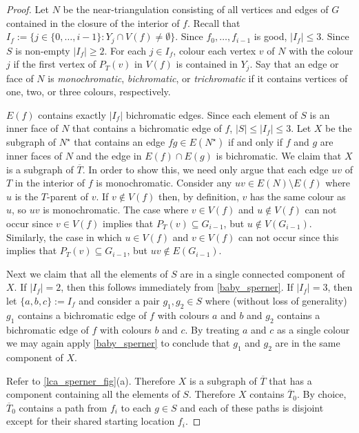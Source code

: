 \documentclass{patmorin}
\begin{document}
\begin{proof}
  Let $N$ be the near-triangulation consisting of all vertices and edges of $G$ contained in the closure of the interior of $f$.  Recall that $I_f:=\{j\in\{0,\ldots,i-1\}: Y_j\cap V(f)\neq\emptyset\}$.  Since $f_0,\ldots,f_{i-1}$ is good, $|I_f|\le 3$.  Since $S$ is non-empty $|I_f|\ge 2$.  For each $j\in I_f$, colour each vertex $v$ of $N$ with the colour $j$ if the first vertex of $P_{T}(v)$ in $V(f)$ is contained in $Y_j$.  Say that an edge or face of $N$ is \emph{monochromatic}, \emph{bichromatic}, or \emph{trichromatic} if it contains vertices of one, two, or three colours, respectively.

  $E(f)$ contains exactly $|I_f|$ bichromatic edges.  Since each element of $S$ is an inner face of $N$ that contains a bichromatic edge of $f$, $|S|\le |I_f|\le 3$.  Let $X$ be the subgraph of $N^\star$ that contains an edge $fg\in E(N^\star)$ if and only if $f$ and $g$ are inner faces of $N$ and the edge in $E(f)\cap E(g)$ is bichromatic.  We claim that $X$ is a subgraph of $\overline{T}$.  In order to show this, we need only argue that each edge $uv$ of $T$ in the interior of $f$ is monochromatic.  Consider any $uv\in E(N)\setminus E(f)$ where $u$ is the $T$-parent of $v$.  If $v\not\in V(f)$ then, by definition, $v$ has the same colour as $u$, so $uv$ is monochromatic. The case where $v\in V(f)$ and $u\not\in V(f)$ can not occur since $v\in V(f)$ implies that $P_T(v)\subseteq G_{i-1}$, but $u\not\in V(G_{i-1})$.  Similarly, the case in which $u\in V(f)$ and $v\in V(f)$ can not occur since this implies that $P_T(v)\subseteq G_{i-1}$, but $uv\not\in E(G_{i-1})$.

  Next we claim that all the elements of $S$ are in a single connected component of $X$.  If $|I_f|=2$, then this follows immediately from \cref{baby_sperner}.  If $|I_f|=3$, then let $\{a,b,c\}:=I_f$ and consider a pair $g_1,g_2\in S$ where (without loss of generality) $g_1$ contains a bichromatic edge of $f$ with colours $a$ and $b$ and $g_2$ contains a bichromatic edge of $f$ with colours $b$ and $c$.  By treating $a$ and $c$ as a single colour we may again apply \cref{baby_sperner} to conclude that $g_1$ and $g_2$ are in the same component of $X$.

  Refer to \cref{lca_sperner_fig}(a).
  Therefore $X$ is a subgraph of $\overline{T}$ that has a component containing all the elements of $S$. Therefore $X$ contains $\overline{T}_0$.  By choice, $\overline{T}_0$ contains a path from $f_i$ to each $g\in S$ and each of these paths is disjoint except for their shared starting location $f_i$. 


\end{proof}
\end{document}
